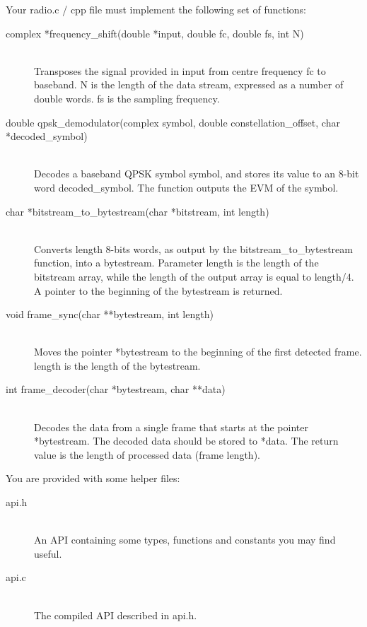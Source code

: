 \documentclass[openany]{book}
\begin{document}
	Your \textsf{radio.c / cpp} file must implement the following set of 
	functions:
	\begin{description}
		\item[complex *frequency\_shift(double *input, double fc, double fs, 
		int N)] \leavevmode
		\,\\ Transposes the signal provided in input from centre frequency 
		\textsf{fc} to baseband. \textsf{N} is the length of the data stream, 
		expressed as a number of double words. \textsf{fs} is the sampling 
		frequency.
		\item[double qpsk\_demodulator(complex symbol, double 
		constellation\_offset, char *decoded\_symbol)] \leavevmode
		\,\\ Decodes a baseband QPSK symbol \textsf{symbol}, and stores its 
		value to an 8-bit word \textsf{decoded\_symbol}. The function outputs 
		the EVM of the symbol.
		\item[char *bitstream\_to\_bytestream(char *bitstream, int length)] \leavevmode
		\,\\ Converts \textsf{length} 8-bits words, as output by the 
		\textsf{bitstream\_to\_bytestream} function, into a bytestream. 
		Parameter \textsf{length} is the length of the bitstream array, while 
		the length of the output array is equal to \textsf{length}/4. A pointer 
		to the beginning of the bytestream is returned.
		\item[void frame\_sync(char **bytestream, int length)] \leavevmode
		\,\\ Moves the pointer \textsf{*bytestream} to the beginning of the 
		first detected frame. \textsf{length} is the length of the bytestream.
		\item[int frame\_decoder(char *bytestream, char **data)] \leavevmode
		\,\\ Decodes the data from a single frame that starts at the pointer 
		\textsf{*bytestream}. The decoded data should be stored to 
		\textsf{*data}. The return value is the length of processed data (frame 
		length).
	\end{description}
	
	You are provided with some helper files:
	\begin{description}
		\item[api.h] \leavevmode
		\,\\ An API containing some types, functions and constants you may find 
		useful.
		\item[api.c] \leavevmode
		\,\\ The compiled API described in \textsf{api.h}.
	\end{description}
	
\end{document}
